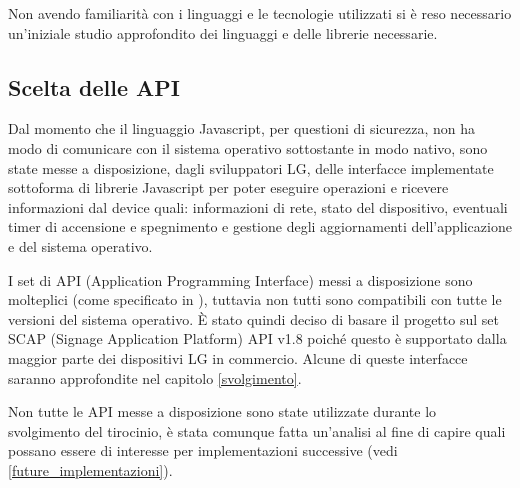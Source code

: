Non avendo familiarità con i linguaggi e le tecnologie utilizzati si è reso necessario un'iniziale studio approfondito dei linguaggi e delle librerie necessarie.

\subsection{Scelta delle API} \label{api}

Dal momento che il linguaggio Javascript, per questioni di sicurezza, non ha modo di comunicare con il sistema operativo sottostante in modo nativo, sono state messe a disposizione, dagli sviluppatori LG, delle interfacce implementate sottoforma di librerie Javascript per poter eseguire operazioni e ricevere informazioni dal device quali: informazioni di rete, stato del dispositivo, eventuali timer di accensione e spegnimento e gestione degli aggiornamenti dell'applicazione e del sistema operativo.

I set di API (Application Programming Interface) messi a disposizione sono molteplici (come specificato in \cite{LgDoc}), tuttavia non tutti sono compatibili con tutte le versioni del sistema operativo. È stato quindi deciso di basare il progetto sul set SCAP (Signage Application Platform) API v1.8 poiché questo è supportato dalla maggior parte dei dispositivi LG in commercio. Alcune di queste interfacce saranno approfondite nel capitolo \ref*{svolgimento}.

Non tutte le API messe a disposizione sono state utilizzate durante lo svolgimento del tirocinio, è stata comunque fatta un'analisi al fine di capire quali possano essere di interesse per implementazioni successive (vedi \ref*{future_implementazioni}).